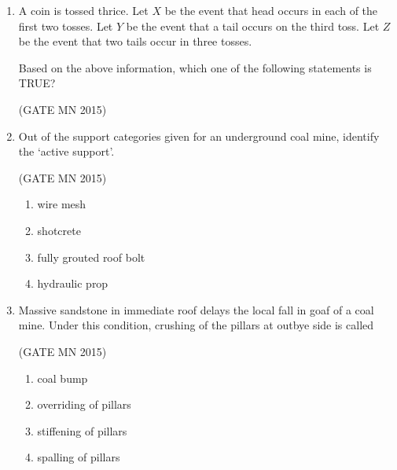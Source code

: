 \documentclass[journal]{IEEEtran}
\begin{document}
\begin{enumerate}
\begin{enumerate}
\end{enumerate}

\item A coin is tossed thrice. Let $X$ be the event that head occurs in each of the first two tosses.  
Let $Y$ be the event that a tail occurs on the third toss.  
Let $Z$ be the event that two tails occur in three tosses.  

Based on the above information, which one of the following statements is TRUE?  

\hfill(GATE MN 2015)

\begin{enumerate}
\end{enumerate}

\item Out of the support categories given for an underground coal mine, identify the `active support'.  

	\hfill(GATE MN 2015)
\begin{multicols}{2}
\begin{enumerate}
\item wire mesh  
\item shotcrete  
\item fully grouted roof bolt  
\item hydraulic prop  
\end{enumerate}
\end{multicols}


\item Massive sandstone in immediate roof delays the local fall in goaf of a coal mine. Under this condition, crushing of the pillars at outbye side is called  

	\hfill(GATE MN 2015)
\begin{multicols}{2}
\begin{enumerate}
\item coal bump  
\item overriding of pillars  
\item stiffening of pillars  
\item spalling of pillars  
\end{enumerate}
\end{multicols}


\end{enumerate}
\end{document}
